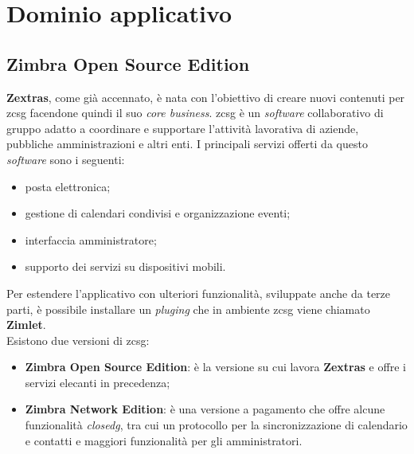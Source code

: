 \section{Dominio applicativo}
    \subsection{Zimbra Open Source Edition}
        \textbf{Zextras}, come già accennato, è nata con l'obiettivo di creare nuovi contenuti per \gls{zcsg} facendone quindi il suo \textit{core business}.
        \gls{zcsg} è un \textit{software} collaborativo di gruppo adatto a coordinare e supportare l'attività lavorativa di aziende, pubbliche amministrazioni e altri enti. I principali servizi offerti da questo \textit{software} sono i seguenti:
        \begin{itemize}
            \item posta elettronica;
            \item gestione di calendari condivisi e organizzazione eventi;
            \item interfaccia amministratore;
            \item supporto dei servizi su dispositivi mobili.
        \end{itemize}
        Per estendere l'applicativo con ulteriori funzionalità, sviluppate anche da terze parti, è possibile installare un \textit{\gls{pluging}} che in ambiente \gls{zcsg} viene chiamato \textbf{Zimlet}. \\
        Esistono due versioni di \gls{zcsg}:
        \begin{itemize}
            \setlength\itemsep{0em}
            \item \textbf{Zimbra Open Source Edition}: è la versione su cui lavora \textbf{Zextras} e offre i servizi elecanti in precedenza;
            \item \textbf{Zimbra Network Edition}: è una versione a pagamento che offre alcune funzionalità \textit{\gls{closedg}}, tra cui un protocollo per la sincronizzazione di calendario e contatti e maggiori funzionalità per gli amministratori.
        \end{itemize}
        

